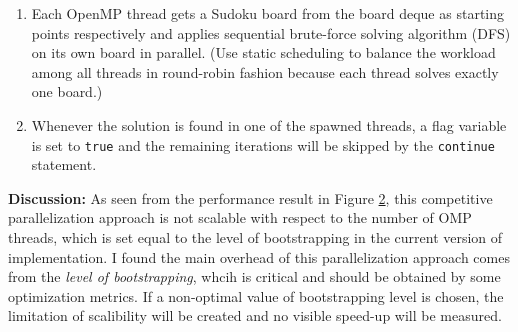 \documentclass[12pt,a4paper]{article}
\newcommand{\code}[1]{\colorbox{light-gray}{\texttt{#1}}}
\begin{document}
\begin{itemize}[itemsep=0pt, parsep=0pt]
\begin{enumerate}[itemsep=0pt, parsep=0pt]
\begin{enumerate}[itemsep=0pt, parsep=0pt]
\begin{figure}[H]
							\caption{}
							\label{fig:bootstrapping}
						\end{figure}
					\end{enumerate}
				\item Each OpenMP thread gets a Sudoku board from the board deque as starting points respectively and applies sequential brute-force solving algorithm (DFS) on its own board in parallel.
				(Use static scheduling to balance the workload among all threads in round-robin fashion because each thread solves exactly one board.)
				\item Whenever the solution is found in one of the spawned threads, a flag variable is set to \code{true} and the remaining iterations will be skipped by the \code{continue} statement.
			\end{enumerate}
			
			 \textbf{Discussion:} As seen from the performance result in Figure \ref{fig:parallel-brute-force}, this competitive parallelization approach is not scalable with respect to the number of OMP threads,
			which is set equal to the level of bootstrapping in the current version of implementation.
			I found the main overhead of this parallelization approach comes from the \textit{level of bootstrapping}, whcih is critical and should be obtained by some optimization metrics.
			If a non-optimal value of bootstrapping level is chosen, the limitation of scalibility will be created and no visible speed-up will be measured.
			\begin{figure}[H]
				\centering
				\caption{}
				\label{fig:parallel-brute-force}
			\end{figure}
		\end{itemize}
\end{document}
